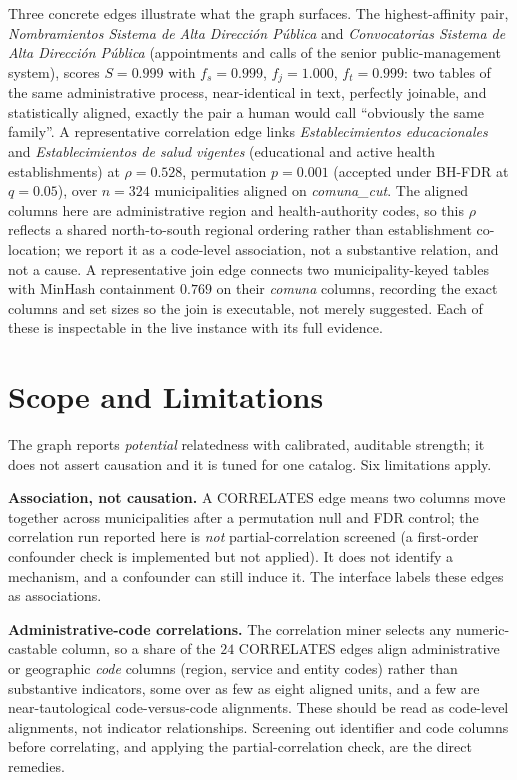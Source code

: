 \documentclass[journal]{IEEEtran}
\newcommand{\dsname}[1]{\textit{#1}}
\begin{document}
Three concrete edges illustrate what the graph surfaces. The highest-affinity pair,
\dsname{Nombramientos Sistema de Alta Direcci\'on P\'ublica} and \dsname{Convocatorias Sistema de Alta
Direcci\'on P\'ublica} (appointments and calls of the senior public-management system), scores $S=0.999$ with
$f_s=0.999$, $f_j=1.000$, $f_t=0.999$: two tables of the same administrative process, near-identical in text,
perfectly joinable, and statistically aligned, exactly the pair a human would call ``obviously the same family''.
A representative correlation edge links \dsname{Establecimientos educacionales} and \dsname{Establecimientos de
salud vigentes} (educational and active health establishments) at $\rho=0.528$, permutation $p=0.001$
(accepted under BH-FDR at $q=0.05$), over $n=324$ municipalities aligned on \dsname{comuna\_cut}. The aligned
columns here are administrative region and health-authority codes, so this $\rho$ reflects a shared
north-to-south regional ordering rather than establishment co-location; we report it as a code-level
association, not a substantive relation, and not a cause. A representative join edge connects two municipality-keyed tables with MinHash
containment $0.769$ on their \dsname{comuna} columns, recording the exact columns and set sizes so the join is
executable, not merely suggested. Each of these is inspectable in the live instance with its full evidence.

\section{Scope and Limitations}\label{sec:scope}

The graph reports \emph{potential} relatedness with calibrated, auditable strength; it does not assert causation
and it is tuned for one catalog. Six limitations apply.

\textbf{Association, not causation.} A CORRELATES edge means two columns move together across municipalities
after a permutation null and FDR control; the correlation run reported here is \emph{not} partial-correlation
screened (a first-order confounder check is implemented but not applied). It does not identify a mechanism, and
a confounder can still induce it. The interface labels these edges as associations.

\textbf{Administrative-code correlations.} The correlation miner selects any numeric-castable column, so a share
of the $24$ CORRELATES edges align administrative or geographic \emph{code} columns (region, service and entity
codes) rather than substantive indicators, some over as few as eight aligned units, and a few are near-tautological
code-versus-code alignments. These should be read as code-level alignments, not indicator relationships.
Screening out identifier and code columns before correlating, and applying the partial-correlation check, are the
direct remedies.
\end{document}
